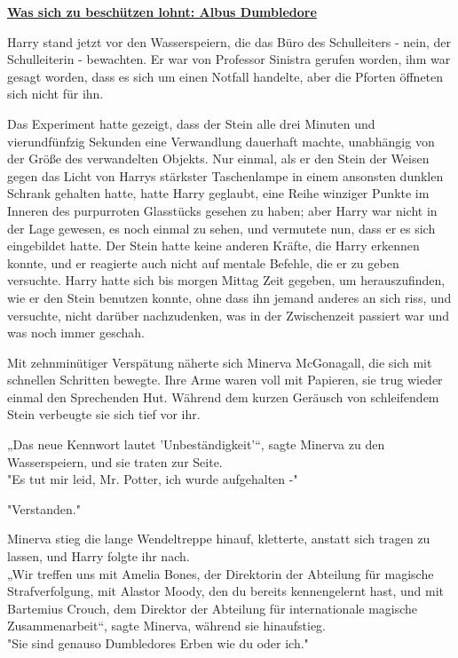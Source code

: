 

\hypertarget{was-sich-zu-beschuxfctzen-lohnt-albus-dumbledore}{%

\textbf{\uline{Was sich zu beschützen lohnt: Albus Dumbledore}}

\hfill\break Harry stand jetzt vor den Wasserspeiern, die das Büro des Schulleiters - nein, der Schulleiterin - bewachten. Er war von Professor Sinistra gerufen worden, ihm war gesagt worden, dass es sich um einen Notfall handelte, aber die Pforten öffneten sich nicht für ihn.

Das Experiment hatte gezeigt, dass der Stein alle drei Minuten und vierundfünfzig Sekunden eine Verwandlung dauerhaft machte, unabhängig von der Größe des verwandelten Objekts. Nur einmal, als er den Stein der Weisen gegen das Licht von Harrys stärkster Taschenlampe in einem ansonsten dunklen Schrank gehalten hatte, hatte Harry geglaubt, eine Reihe winziger Punkte im Inneren des purpurroten Glasstücks gesehen zu haben; aber Harry war nicht in der Lage gewesen, es noch einmal zu sehen, und vermutete nun, dass er es sich eingebildet hatte. Der Stein hatte keine anderen Kräfte, die Harry erkennen konnte, und er reagierte auch nicht auf mentale Befehle, die er zu geben versuchte. Harry hatte sich bis morgen Mittag Zeit gegeben, um herauszufinden, wie er den Stein benutzen konnte, ohne dass ihn jemand anderes an sich riss, und versuchte, nicht darüber nachzudenken, was in der Zwischenzeit passiert war und was noch immer geschah.

Mit zehnminütiger Verspätung näherte sich Minerva McGonagall, die sich mit schnellen Schritten bewegte. Ihre Arme waren voll mit Papieren, sie trug wieder einmal den Sprechenden Hut. Während dem kurzen Geräusch von schleifendem Stein verbeugte sie sich tief vor ihr.

„Das neue Kennwort lautet 'Unbeständigkeit'“, sagte Minerva zu den Wasserspeiern, und sie traten zur Seite.\\ "Es tut mir leid, Mr. Potter, ich wurde aufgehalten -"

"Verstanden."

Minerva stieg die lange Wendeltreppe hinauf, kletterte, anstatt sich tragen zu lassen, und Harry folgte ihr nach.\\ „Wir treffen uns mit Amelia Bones, der Direktorin der Abteilung für magische Strafverfolgung, mit Alastor Moody, den du bereits kennengelernt hast, und mit Bartemius Crouch, dem Direktor der Abteilung für internationale magische Zusammenarbeit“, sagte Minerva, während sie hinaufstieg.\\ "Sie sind genauso Dumbledores Erben wie du oder ich."

}
